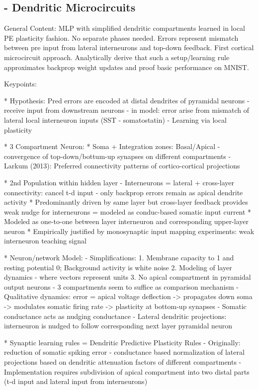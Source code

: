 \documentclass[colorinlistoftodos]{article}
\theoremstyle{definition}
\begin{document}
\subsection*{\citet{sacramento2018} - Dendritic Microcircuits}

General Content: MLP with simplified dendritic compartments learned in local PE plasticity fashion. No separate phases needed. Errors represent mismatch between pre input from lateral interneurons and top-down feedback. First cortical microcircuit approach. Analytically derive that such a setup/learning rule approximates backprop weight updates and proof basic performance on MNIST.


Keypoints:

* Hypothesis: Pred errors are encoded at distal dendrites of pyramidal neurons - receive input from downstream neurons - in model: error arise from mismatch of lateral local interneuron inputs (SST - somatostatin) - Learning via local plasticity

* 3 Compartment Neuron:
    * Soma + Integration zones: Basal/Apical - convergence of top-down/bottum-up synapses on different compartments - Larkum (2013): Preferred connectivity patterns of cortico-cortical projections

* 2nd Population within hidden layer - Interneurons = lateral + cross-layer connectivity: cancel t-d input - only backprop errors remain as apical dendrite activity
    * Predominantly driven by same layer but cross-layer feedback provides weak nudge for interneurons = modeled as conduc-based somatic input current
    * Modeled as one-to-one between layer interneuron and corresponding upper-layer neuron
    * Empirically justified by monosynaptic input mapping experiments: weak interneuron teaching signal

* Neuron/network Model:
    - Simplifications:
        1. Membrane capacity to 1 and resting potential 0; Background activity is white noise
        2. Modeling of layer dynamics - where vectors represent units
        3. No apical compartment in pyramidal output neurons - 3 compartments seem to suffice as comparison mechanism
    - Qualitative dynamics: error = apical voltage deflection -> propagates down soma -> modulates somatic firing rate -> plasticity at bottom-up synapses
    - Somatic conductance acts as nudging conductance
    - Lateral dendritic projections: interneuron is nudged to follow corresponding next layer pyramidal neuron

* Synaptic learning rules = Dendritic Predictive Plasticity Rules
    - Originally: reduction of somatic spiking error
    - conductance based normalization of lateral projections based on dendritic attenuation factors of different compartments
    - Implementation requires subdivision of apical compartment into two distal parts (t-d input and lateral input from interneurons)
\end{document}
